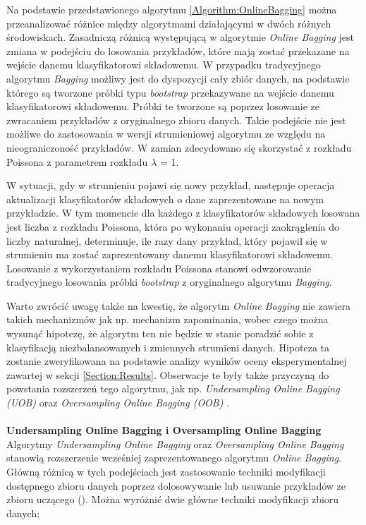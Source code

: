 \noindent Na podstawie przedstawionego algorytmu \ref{Algorithm:OnlineBagging} można przeanalizować różnice między algorytmami działającymi w dwóch różnych środowiskach. Zasadniczą różnicą występującą w algorytmie \textit{Online Bagging} jest zmiana w podejściu do losowania przykładów, które mają zostać przekazane na wejście danemu klasyfikatorowi składowemu. W przypadku tradycyjnego algorytmu \textit{Bagging} możliwy jest do dyspozycji cały zbiór danych, na podstawie którego są tworzone próbki typu \textit{bootstrap} przekazywane na wejście danemu klasyfikatorowi składowemu. Próbki te tworzone są poprzez losowanie ze zwracaniem przykładów z oryginalnego zbioru danych. Takie podejście nie jest możliwe do zastosowania w wersji strumieniowej algorytmu ze względu na nieograniczoność przykładów. W zamian zdecydowano się skorzystać z rozkładu Poissona z parametrem rozkładu $\lambda$ = 1. 

W sytuacji, gdy w strumieniu pojawi się nowy przykład, następuje operacja aktualizacji klasyfikatorów składowych o dane zaprezentowane na nowym przykładzie. W tym momencie dla każdego z klasyfikatorów składowych losowana jest liczba z rozkładu Poissona, która po wykonaniu operacji zaokrąglenia do liczby naturalnej, determinuje, ile razy dany przykład, który pojawił się w strumieniu ma zostać zaprezentowany danemu klasyfikatorowi składowemu. Losowanie z wykorzystaniem rozkładu Poissona stanowi odwzorowanie tradycyjnego losowania próbki \textit{bootstrap} z oryginalnego algorytmu \textit{Bagging}.

Warto zwrócić uwagę także na kwestię, że algorytm \textit{Online Bagging} nie zawiera takich mechanizmów jak np. mechanizm zapominania, wobec czego można wysunąć hipotezę, że algorytm ten nie będzie w stanie poradzić sobie z klasyfikacją niezbalansowanych i zmiennych strumieni danych. Hipoteza ta zostanie zweryfikowana na podstawie analizy wyników oceny eksperymentalnej zawartej w sekcji \ref{Section:Results}. Obserwacje te były także przyczyną do powstania rozszerzeń tego algorytmu, jak np. \textit{Undersampling Online Bagging (UOB)} oraz \textit{Oversampling Online Bagging (OOB)} \cite{Article:OBFirst}\cite{Article:OBSecond}.\\\\
\textbf{Undersampling Online Bagging i Oversampling Online Bagging}\\

\noindent Algorytmy \textit{Undersampling Online Bagging} oraz \textit{Oversampling Online Bagging} stanowią rozszerzenie wcześniej zaprezentowanego algorytmu \textit{Online Bagging}. Główną różnicą w tych podejściach jest zastosowanie techniki modyfikacji dostępnego zbioru danych poprzez dolosowywanie lub usuwanie przykładów ze zbioru uczącego (). Można wyróżnić dwie główne techniki modyfikacji zbioru danych:

